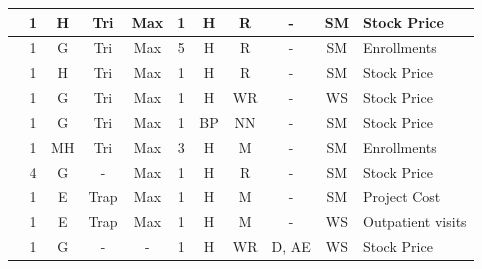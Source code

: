 \begin{center}
\begin{landscape}
\begin{longtable}[c]{|m{4cm}|c|c|c|c|c|c|c|c|c|m{5cm}|}
\cite{huarng2001effective} & 1                  & H             & Tri  & Max                & 1              & H                       & R               & -                        & SM              & Stock Price           \\ \hline
\cite{Chen2002}            & 1                  & G                  & Tri  & Max                & 5              & H                       & R              & -                        & SM              & Enrollments           \\ \hline
\cite{Huarng2004}          & 1                  & H             & Tri  & Max                & 1              & H                       & R               & -                        & SM              & Stock Price           \\ \hline
\cite{yu2005weighted}              & 1                  & G                  & Tri  & Max                & 1              & H                       & WR      & -                        & WS            & Stock Price           \\ \hline
\cite{Huarng2006}          & 1                  & G                  & Tri  & Max                & 1              & BP                              & NN                 & -                        & SM              & Stock Price           \\ \hline
\cite{Chen2006a}           & 1                  & MH         & Tri  & Max                & 3              & H                       & M              & -                        & SM              & Enrollments           \\ \hline
\cite{Lee2006}             & 4                  & G                  & -           & Max                & 1              & H                       & R               & -                        & SM              & Stock Price           \\ \hline
\cite{Cheng2006a}          & 1                  & E               & Trap & Max                & 1              & H                       & M              & -                        & SM              & Project Cost          \\ \hline
\cite{Cheng2008}          & 1                  & E               & Trap & Max                & 1              & H                       & M              & -                        & WS            & Outpatient visits     \\ \hline
\cite{Cheng2008a}           & 1                  & G                  & -           & -                      & 1              & H                       & WR      & D, AE           & WS            & Stock Price           \\ \hline

\end{longtable}
\end{landscape}
\end{center}

